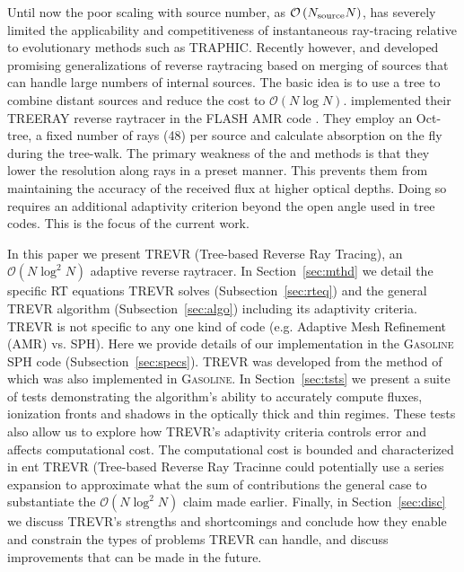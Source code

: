\documentclass[fleq,usenatbib]{mnras}
\newcommand{\acro}{TREVR}
\newcommand{\bigO}[1]{\mathcal{O}\left(#1\right)}
\newcommand{\NS}{N_{\rm source}}
\begin{document}
{Until now the poor scaling with source number, as $\bigO{\NS N}$, has severely 
limited the applicability and competitiveness of instantaneous ray-tracing 
relative to evolutionary methods such as TRAPHIC. Recently however, 
\cite{Woods2015} and \cite{HaidEt18} developed promising generalizations of 
reverse raytracing based on merging of sources that can handle large numbers 
of internal sources. The basic idea is to use a tree to combine distant 
sources and reduce the cost to $\bigO{N \log N}$. \cite{HaidEt18} implemented 
their TREERAY reverse raytracer in the FLASH AMR code \citep{FryxellEt2000}.
They employ an Oct-tree, a fixed number of rays (48) per source and calculate 
absorption on the fly during the tree-walk.  The primary weakness of the 
\cite{Woods2015} and \cite{HaidEt18} methods is that they lower the resolution 
along rays in a preset manner.  This prevents them from maintaining the 
accuracy of the received flux at higher optical depths. Doing so requires an 
additional adaptivity criterion beyond the open angle used in tree codes.
This is the focus of the current work.

In this paper we present \acro{} (Tree-based Reverse Ray Tracing), an $\bigO{N 
\log^2 N}$ adaptive reverse raytracer. In Section~\ref{sec:mthd} we detail 
the specific RT equations \acro{} solves (Subsection~\ref{sec:rteq}) and the 
general \acro{} algorithm (Subsection~\ref{sec:algo}) including its adaptivity 
criteria. \acro{} is not specific to any one kind of code (e.g. Adaptive Mesh 
Refinement (AMR) vs. SPH). Here we provide details of our implementation in 
the \textsc{Gasoline} SPH code (Subsection~\ref{sec:specs}). \acro{} was 
developed from the method of \cite{Woods2015} which was also implemented in 
\textsc{Gasoline}. In Section~\ref{sec:tsts} we present a suite of tests 
demonstrating the algorithm's ability to accurately compute fluxes, ionization 
fronts and shadows in the optically thick and thin regimes. These tests also 
allow us to explore how \acro{}'s adaptivity criteria controls error and 
affects computational cost. The computational cost is bounded and 
characterized in ent \acro{} (Tree-based Reverse Ray Tracinne could 
potentially use a series expansion to approximate what the sum of 
contributions 
the general case to substantiate the $\bigO{N \log^2 N}$ 
claim made earlier. Finally, in Section~\ref{sec:disc} we discuss \acro{}'s 
strengths and shortcomings and conclude how they enable and constrain the 
types of problems \acro{} can handle, and discuss improvements that can be 
made in the future.

}
\end{document}

